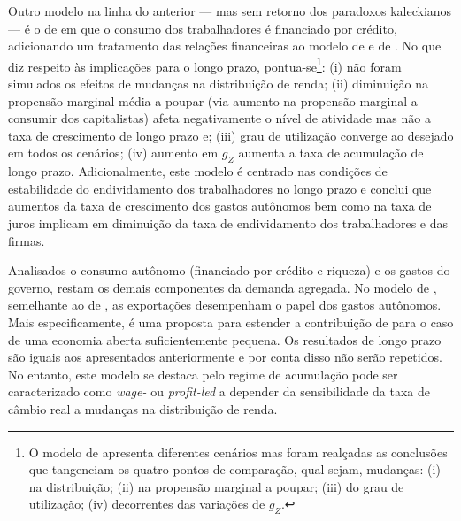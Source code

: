 Outro modelo na linha do anterior --- mas sem retorno dos paradoxos kaleckianos --- é o de \textcite{mandarino_financing_2018} em que o consumo dos trabalhadores é financiado por crédito, adicionando um tratamento das relações financeiras ao modelo de \textcite{pariboni_household_2016} e de \textcite{fagundes_dinamica_2017}. No que diz respeito às implicações para o longo prazo, pontua-se\footnote{
	O modelo de \textcite{mandarino_financing_2018} apresenta diferentes cenários mas foram realçadas as conclusões que tangenciam os quatro pontos de comparação, qual sejam, mudanças: (i) na distribuição; (ii) na propensão marginal a poupar; (iii) do grau de utilização; (iv) decorrentes das variações de $g_Z$.
}: 
	(i) não foram simulados os efeitos de mudanças na distribuição de renda; 
	(ii) diminuição na propensão marginal média a poupar (via aumento na propensão marginal a consumir dos capitalistas) afeta negativamente o nível de atividade mas não a taxa de crescimento de longo prazo e; 
	(iii) grau de utilização converge ao desejado em todos os cenários; 
	(iv) aumento em $g_Z$ aumenta a taxa de acumulação de longo prazo.
Adicionalmente, este modelo é centrado nas condições de estabilidade do endividamento dos trabalhadores no longo prazo e conclui que aumentos da taxa de crescimento dos gastos autônomos bem como na taxa de juros implicam em diminuição da taxa de endividamento dos trabalhadores e das firmas. 



Analisados o consumo autônomo (financiado por crédito e riqueza) e os gastos do governo, restam os demais componentes da demanda agregada.
No modelo de \textcite{nah_long-run_2017}, semelhante ao de \textcite{dejuan_hidden_2017}, as exportações desempenham o papel dos gastos autônomos. Mais especificamente, é uma proposta para estender a contribuição de \textcite{serrano_sraffian_1995} para o caso de uma economia aberta suficientemente pequena. Os resultados de longo prazo são iguais aos apresentados anteriormente e por conta disso não serão repetidos. No entanto, este modelo se destaca pelo regime de acumulação pode ser caracterizado como \textit{wage-} ou \textit{profit-led} a depender da sensibilidade da taxa de câmbio real a mudanças na distribuição de renda. 

